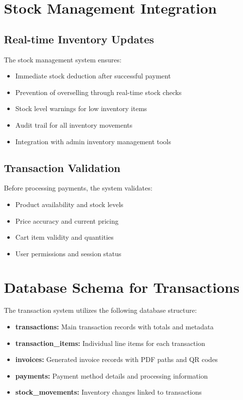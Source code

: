 \section{Stock Management Integration}

\subsection*{Real-time Inventory Updates}

The stock management system ensures:
\begin{itemize}
  \item Immediate stock deduction after successful payment
  \item Prevention of overselling through real-time stock checks
  \item Stock level warnings for low inventory items
  \item Audit trail for all inventory movements
  \item Integration with admin inventory management tools
\end{itemize}

\subsection*{Transaction Validation}

Before processing payments, the system validates:
\begin{itemize}
  \item Product availability and stock levels
  \item Price accuracy and current pricing
  \item Cart item validity and quantities
  \item User permissions and session status
\end{itemize}

\section{Database Schema for Transactions}

The transaction system utilizes the following database structure:

\begin{itemize}
  \item \textbf{transactions:} Main transaction records with totals and metadata
  \item \textbf{transaction\_items:} Individual line items for each transaction
  \item \textbf{invoices:} Generated invoice records with PDF paths and QR codes
  \item \textbf{payments:} Payment method details and processing information
  \item \textbf{stock\_movements:} Inventory changes linked to transactions
\end{itemize}

